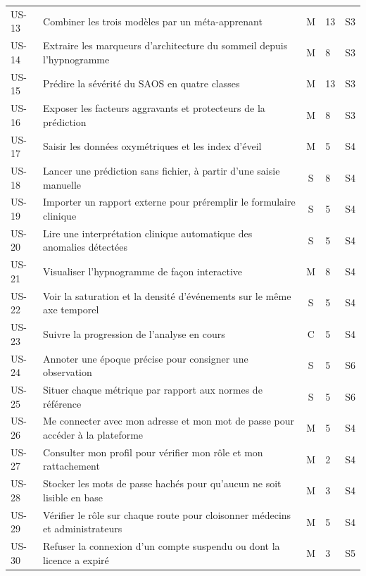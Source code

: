 \begin{longtable}{@{}p{1.25cm}L{9.1cm}cp{0.75cm}p{0.9cm}@{}}
US-13 & Combiner les trois modèles par un méta-apprenant & M & 13 & S3 \\
US-14 & Extraire les marqueurs d'architecture du sommeil depuis l'hypnogramme
& M & 8 & S3 \\
US-15 & Prédire la sévérité du SAOS en quatre classes & M & 13 & S3 \\
US-16 & Exposer les facteurs aggravants et protecteurs de la prédiction & M & 8 & S3 \\
US-17 & Saisir les données oxymétriques et les index d'éveil & M & 5 & S4 \\
US-18 & Lancer une prédiction sans fichier, à partir d'une saisie manuelle & S & 8 & S4 \\
US-19 & Importer un rapport externe pour préremplir le formulaire clinique
& S & 5 & S4 \\
US-20 & Lire une interprétation clinique automatique des anomalies détectées
& S & 5 & S4 \\

US-21 & Visualiser l'hypnogramme de façon interactive & M & 8 & S4 \\
US-22 & Voir la saturation et la densité d'événements sur le même axe temporel
& S & 5 & S4 \\
US-23 & Suivre la progression de l'analyse en cours & C & 5 & S4 \\
US-24 & Annoter une époque précise pour consigner une observation & S & 5 & S6 \\
US-25 & Situer chaque métrique par rapport aux normes de référence & S & 5 & S6 \\

US-26 & Me connecter avec mon adresse et mon mot de passe pour accéder à la plateforme
& M & 5 & S4 \\
US-27 & Consulter mon profil pour vérifier mon rôle et mon rattachement & M & 2 & S4 \\
US-28 & Stocker les mots de passe hachés pour qu'aucun ne soit lisible en base
& M & 3 & S4 \\
US-29 & Vérifier le rôle sur chaque route pour cloisonner médecins et administrateurs
& M & 5 & S4 \\
US-30 & Refuser la connexion d'un compte suspendu ou dont la licence a expiré
& M & 3 & S5 \\


\end{longtable}
